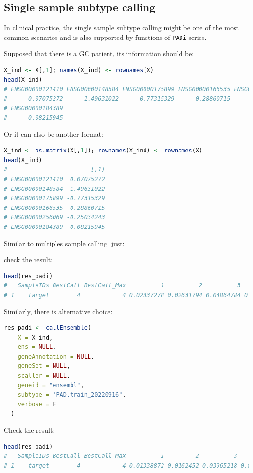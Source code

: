 \documentclass[
  12pt,
]{book}
\newcommand{\passthrough}[1]{#1}
\begin{document}
\hypertarget{single-sample-subtype-calling}{%
\subsection{Single sample subtype calling}\label{single-sample-subtype-calling}}

In clinical practice, the single sample subtype calling might be one of the most common scenarios and is also supported by functions of \passthrough{\lstinline!PADi!} series.

Supposed that there is a GC patient, its information should be:

\begin{lstlisting}[language=R]
X_ind <- X[,1]; names(X_ind) <- rownames(X)
head(X_ind)
# ENSG00000121410 ENSG00000148584 ENSG00000175899 ENSG00000166535 ENSG00000256069 
#      0.07075272     -1.49631022     -0.77315329     -0.28860715     -0.25034243 
# ENSG00000184389 
#      0.08215945
\end{lstlisting}

Or it can also be another format:

\begin{lstlisting}[language=R]
X_ind <- as.matrix(X[,1]); rownames(X_ind) <- rownames(X)
head(X_ind)
#                        [,1]
# ENSG00000121410  0.07075272
# ENSG00000148584 -1.49631022
# ENSG00000175899 -0.77315329
# ENSG00000166535 -0.28860715
# ENSG00000256069 -0.25034243
# ENSG00000184389  0.08215945
\end{lstlisting}

Similar to multiples sample calling, just:

check the result:

\begin{lstlisting}[language=R]
head(res_padi)
#   SampleIDs BestCall BestCall_Max          1          2          3         4
# 1    target        4            4 0.02337278 0.02631794 0.04864784 0.3336484
\end{lstlisting}

Similarly, there is alternative choice:

\begin{lstlisting}[language=R]
res_padi <- callEnsemble(
    X = X_ind,
    ens = NULL,
    geneAnnotation = NULL,
    geneSet = NULL,
    scaller = NULL,
    geneid = "ensembl",
    subtype = "PAD.train_20220916",
    verbose = F
  )
\end{lstlisting}

Check the result:

\begin{lstlisting}[language=R]
head(res_padi)
#   SampleIDs BestCall BestCall_Max          1         2          3         4
# 1    target        4            4 0.01338872 0.0162452 0.03965218 0.8052567
\end{lstlisting}
\end{document}
